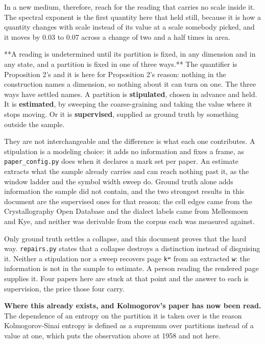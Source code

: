 In a new medium, therefore, reach for the reading that carries no scale inside it. The spectral exponent is the first quantity here that held still, because it is how a quantity changes with scale instead of its value at a scale somebody picked, and it moves by 0.03 to 0.07 across a change of two and a half times in area.

**A reading is undetermined until its partition is fixed, in any dimension and in any state, and a partition is fixed in one of three ways.** The quantifier is Proposition 2's and it is here for Proposition 2's reason: nothing in the construction names a dimension, so nothing about it can turn on one. The three ways have settled names. A partition is \textbf{stipulated}, chosen in advance and held. It is \textbf{estimated}, by sweeping the coarse-graining and taking the value where it stops moving. Or it is \textbf{supervised}, supplied as ground truth by something outside the sample.

They are not interchangeable and the difference is what each one contributes. A stipulation is a modeling choice: it adds no information and fixes a frame, as \texttt{paper\_\allowbreak{}config.\allowbreak{}py} does when it declares a mark set per paper. An estimate extracts what the sample already carries and can reach nothing past it, as the window ladder and the symbol width sweep do. Ground truth alone adds information the sample did not contain, and the two strongest results in this document are the supervised ones for that reason: the cell edges came from the Crystallography Open Database and the dialect labels came from Mellesmoen and Kye, and neither was derivable from the corpus each was measured against.

Only ground truth settles a collapse, and this document proves that the hard way. \texttt{repairs.\allowbreak{}py} states that a collapse destroys a distinction instead of disguising it. Neither a stipulation nor a sweep recovers page \texttt{kʷ} from an extracted \texttt{w}: the information is not in the sample to estimate. A person reading the rendered page supplies it. Four papers here are stuck at that point and the answer to each is supervision, the price those four carry.

\textbf{Where this already exists, and Kolmogorov's paper has now been read.} The dependence of an entropy on the partition it is taken over is the reason Kolmogorov-Sinai entropy is defined as a supremum over partitions instead of a value at one, which puts the observation above at 1958 and not here.

